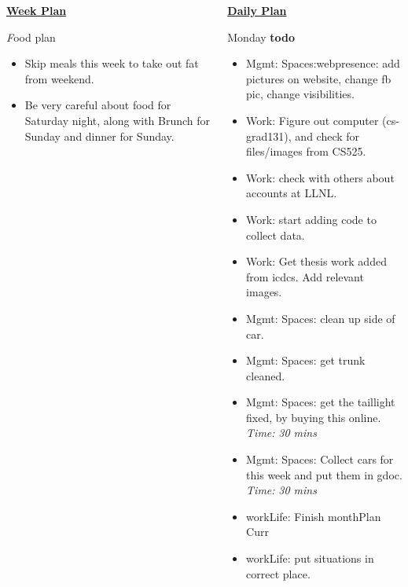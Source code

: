 \documentclass[serif,mathserif,final]{beamer}
\newcommand{\timeEst}[1]{\textit{Time:} \textit{#1}}
\begin{document}
\begin{frame}{}
\begin{columns}[t]
\begin{column}{0.27\linewidth} {\textbf{\underline{Week Plan}}}
  \begin{block}{\textit Food plan } 
    \begin{itemize} 
      \small \item \small Skip meals this week to take out fat from weekend. 
      \item \small Be very careful about food for Saturday night, along with Brunch for Sunday and dinner for Sunday. 
    \end{itemize} 
  \end{block} 
\end{column} %

\begin{column}{0.27\linewidth}{\textbf{\underline{Daily Plan}}} 




\begin{block}{\small Monday } 
\textbf{todo} \\ 
\begin{itemize}  
  \tiny \item \tiny Mgmt: Spaces:webpresence: add pictures on website, change fb pic, change visibilities. 
\item \tiny Work: Figure out computer (cs-grad131), and check for files/images from CS525. 
\item \tiny Work: check with others about accounts at LLNL. 
\item \tiny Work: start adding code to collect data. 

\item \tiny Work: Get thesis work added from icdcs. Add relevant images. 
  
\item \tiny Mgmt: Spaces: clean up side of car. 
\item \tiny Mgmt: Spaces: get trunk cleaned. 
\item \tiny Mgmt: Spaces: get the taillight fixed, by buying this online. \timeEst{30 mins}
\item \tiny Mgmt: Spaces: Collect cars for this week and put them in gdoc. \timeEst{30 mins} 
  
\item \tiny workLife: Finish monthPlan Curr 
\item \tiny workLife: put situations in correct place. 
  

\end{itemize}
\end{block}
\end{column}
\end{columns}
\end{frame}
\end{document}
